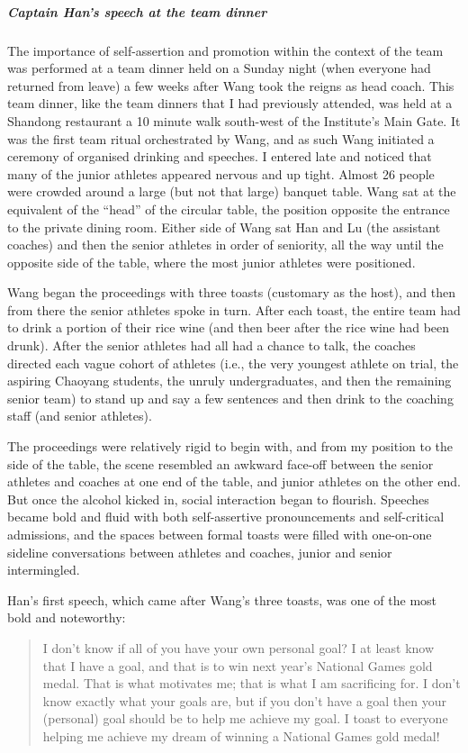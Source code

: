 \begin{CJK}{UTF8}{gbsn}
\subparagraph{Captain Han's speech at the team dinner}
The importance of self-assertion and promotion within the context of the team was performed at a team dinner held on a Sunday night (when everyone had returned from leave) a few weeks after Wang took the reigns as head coach.  This team dinner, like the team dinners that I had previously attended, was held at a Shandong restaurant a 10 minute walk south-west of the Institute's Main Gate.  It was the first team ritual orchestrated by Wang, and as such Wang initiated a ceremony of organised drinking and speeches.  I entered late and noticed that many of the junior athletes appeared nervous and up tight. Almost 26 people were crowded around a large (but not that large) banquet table.  Wang sat at the equivalent of the ``head'' of the circular table, the position opposite the entrance to the private dining room.  Either side of Wang sat Han and Lu (the assistant coaches) and then the senior athletes in order of seniority, all the way until the opposite side of the table, where the most junior athletes were positioned.

Wang began the proceedings with three toasts (customary as the host), and then from there the senior athletes spoke in turn.  After each toast, the entire team had to drink a portion of their rice wine (and then beer after the rice wine had been drunk).  After the senior athletes had all had a chance to talk, the coaches directed each vague cohort of athletes (i.e., the very youngest athlete on trial, the aspiring Chaoyang students, the unruly undergraduates, and then the remaining senior team) to stand up and say a few sentences and then drink to the coaching staff (and senior athletes).

The proceedings were relatively rigid to begin with, and from my position to the side of the table, the scene resembled an awkward face-off between the senior athletes and coaches at one end of the table, and junior athletes on the other end.  But once the alcohol kicked in, social interaction began to flourish. Speeches became bold and fluid with both self-assertive pronouncements and self-critical admissions, and the spaces between formal toasts were filled with one-on-one sideline conversations between athletes and coaches, junior and senior intermingled.

Han's first speech, which came after Wang's three toasts, was one of the most bold and noteworthy:

  \begin{quotation}
    I don’t know if all of you have your own personal goal?  I at least know that I have a goal, and that is to win next year’s National Games gold medal.  That is what motivates me; that is what I am sacrificing for.  I don’t know exactly what your goals are, but if you don't have a goal then your (personal) goal should be to help me achieve my goal.  I toast to everyone helping me achieve my dream of winning a National Games gold medal!
  \end{quotation}


\end{CJK}
